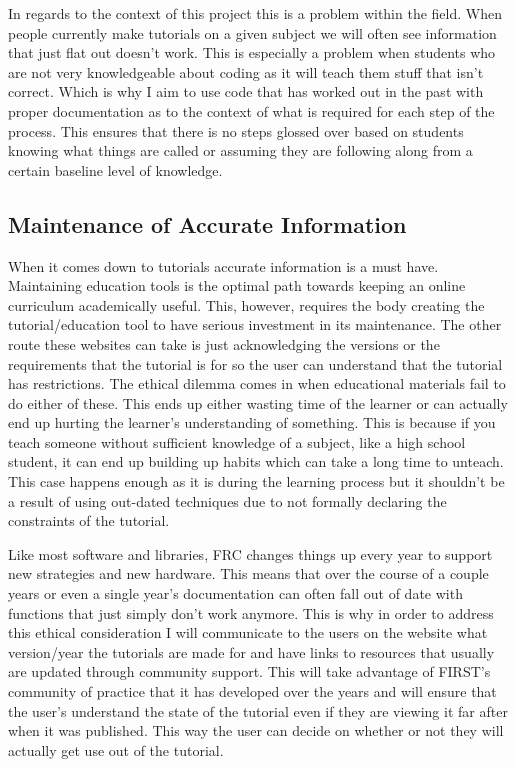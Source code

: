 \documentclass[10pt,twocolumn]{article}
\begin{document}
In regards to the context of this project this is a problem within the field. When people currently make tutorials on a given subject we will often see information that just flat out doesn't work. This is especially a problem when students who are not very knowledgeable about coding as it will teach them stuff that isn't correct. Which is why I aim to use code that has worked out in the past with proper documentation as to the context of what is required for each step of the process. This ensures that there is no steps glossed over based on students knowing what things are called or assuming they are following along from a certain baseline level of knowledge. 

\subsection{Maintenance of Accurate Information}
When it comes down to tutorials accurate information is a must have. Maintaining education tools is the optimal path towards keeping an online curriculum academically useful\cite{Davies_et_al_2017}. This, however, requires the body creating the tutorial/education tool to have serious investment in its maintenance. The other route these websites can take is just acknowledging the versions or the requirements that the tutorial is for so the user can understand that the tutorial has restrictions. The ethical dilemma comes in when educational materials fail to do either of these. This ends up either wasting time of the learner or can actually end up hurting the learner's understanding of something. This is because if you teach someone without sufficient knowledge of a subject, like a high school student, it can end up building up habits which can take a long time to unteach. This case happens enough as it is during the learning process but it shouldn't be a result of using out-dated techniques due to not formally declaring the constraints of the tutorial. 

Like most software and libraries, FRC changes things up every year to support new strategies and new hardware. This means that over the course of a couple years or even a single year's documentation can often fall out of date with functions that just simply don't work anymore. This is why in order to address this ethical consideration I will communicate to the users on the website what version/year the tutorials are made for and have links to resources that usually are updated through community support. This will take advantage of FIRST's community of practice that it has developed over the years and will ensure that the user's understand the state of the tutorial even if they are viewing it far after when it was published. This way the user can decide on whether or not they will actually get use out of the tutorial.
\end{document}
